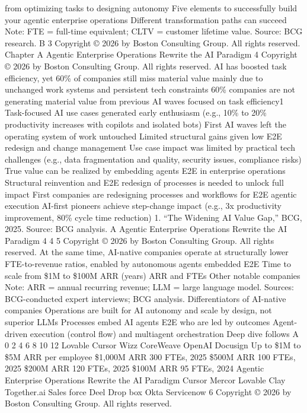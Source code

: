 from optimizing
tasks to
designing
autonomy
Five elements
to successfully
build your
agentic
enterprise
operations
Different
transformation
paths can
succeed
Note: FTE = full-time equivalent; CLTV = customer lifetime value.
Source: BCG research.
B
3
Copyright © 2026 by Boston Consulting Group. All rights reserved.
Chapter A
Agentic Enterprise Operations Rewrite
the AI Paradigm
4
Copyright © 2026 by Boston Consulting Group. All rights reserved.
AI has boosted task efficiency, yet 60\% of companies still miss material value
mainly due to unchanged work systems and persistent tech constraints
60\% companies are not generating material value
from previous AI waves focused on task efficiency1
Task-focused AI use cases generated early enthusiasm
(e.g., 10\% to 20\% productivity increases with copilots and isolated bots)
First AI waves left the operating system of work untouched
Limited structural gains given low E2E redesign and change management
Use case impact was limited by practical tech challenges
(e.g., data fragmentation and quality, security issues, compliance risks)
True value can be realized by embedding
agents E2E in enterprise operations
Structural reinvention and E2E redesign of
processes is needed to unlock full impact
First companies are redesigning processes and
workflows for E2E agentic execution
AI-first pioneers achieve step-change impact
(e.g., 3x productivity improvement, 80\% cycle time reduction)
1. “The Widening AI Value Gap,” BCG, 2025.
Source: BCG analysis.
A
Agentic Enterprise Operations Rewrite the AI Paradigm
4
4
5
Copyright © 2026 by Boston Consulting Group. All rights reserved.
At the same time, AI-native companies operate at structurally lower
FTE-to-revenue ratios, enabled by autonomous agents embedded E2E
Time to scale from \$1M to \$100M ARR (years)
ARR and FTEs
Other notable companies
Note: ARR = annual recurring revenue;
LLM = large language model.
Sources: BCG-conducted expert interviews; BCG analysis.
Differentiators of AI-native companies
Operations are built for AI
autonomy and scale by
design, not superior LLMs
Processes embed AI
agents E2E who are led
by outcomes
Agent-driven execution
(control flow) and
multiagent orchestration
Deep dive
follows
A
0
2
4
6
8
10
12
Lovable
Cursor
Wizz
CoreWeave
OpenAI
Docusign
Up to \$1M to \$5M ARR
per employee
\$1,000M ARR 300 FTEs, 2025
\$500M ARR
100 FTEs, 2025
\$200M ARR
120 FTEs, 2025
\$100M ARR
95 FTEs, 2024
Agentic Enterprise Operations Rewrite the AI Paradigm
Cursor
Mercor
Lovable
Clay
Together.ai
Sales
force
Deel
Drop
box
Okta
Servicenow
6
Copyright © 2026 by Boston Consulting Group. All rights reserved.
